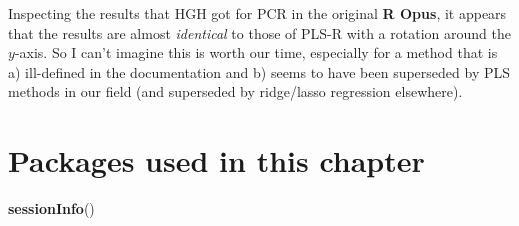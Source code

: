 \documentclass[
]{book}
\newenvironment{Shaded}{\begin{snugshade}}{\end{snugshade}}
\newcommand{\FunctionTok}[1]{\textcolor[rgb]{0.13,0.29,0.53}{\textbf{#1}}}
\newcommand{\NormalTok}[1]{#1}
\begin{document}
Inspecting the results that HGH got for PCR in the original \textbf{R Opus}, it appears that the results are almost \emph{identical} to those of PLS-R with a rotation around the \(y\)-axis. So I can't imagine this is worth our time, especially for a method that is a) ill-defined in the documentation and b) seems to have been superseded by PLS methods in our field (and superseded by ridge/lasso regression elsewhere).

\section{Packages used in this chapter}\label{packages-used-in-this-chapter-10}

\begin{Shaded}
\begin{Highlighting}[]
\FunctionTok{sessionInfo}\NormalTok{()}
\end{Highlighting}
\end{Shaded}
\end{document}
